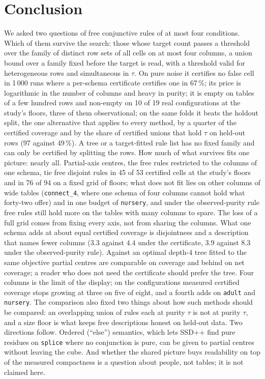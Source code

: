 \documentclass[11pt]{article}
\begin{document}
\section{Conclusion}
We asked two questions of free conjunctive rules of at most four conditions. Which of them survive the search: those whose target count passes a threshold over the family of distinct row sets of all cells on at most four columns, a union bound over a family fixed before the target is read, with a threshold valid for heterogeneous rows and simultaneous in $\tau$. On pure noise it certifies no false cell in 1\,000 runs where a per-schema certificate certifies one in 67\,\%; its price is logarithmic in the number of columns and heavy in purity; it is empty on tables of a few hundred rows and non-empty on 10 of 19 real configurations at the study's floors, three of them observational; on the same folds it beats the holdout split, the one alternative that applies to every method, by a quarter of the certified coverage and by the share of certified unions that hold $\tau$ on held-out rows (97 against 49\,\%). A tree or a target-fitted rule list has no fixed family and can only be certified by splitting the rows. How much of what survives fits one picture: nearly all. Partial-axis centres, the free rules restricted to the columns of one schema, tie free disjoint rules in 45 of 53 certified cells at the study's floors and in 76 of 94 on a fixed grid of floors; what does not fit lies on other columns of wide tables (\texttt{connect\_4}, where one schema of four columns cannot hold what forty-two offer) and in one budget of \texttt{nursery}, and under the observed-purity rule free rules still hold more on the tables with many columns to spare. The loss of a full grid comes from fixing every axis, not from sharing the columns. What one schema adds at about equal certified coverage is disjointness and a description that names fewer columns ($3.3$ against $4.4$ under the certificate, $3.9$ against $8.3$ under the observed-purity rule). Against an optimal depth-4 tree fitted to the same objective partial centres are comparable on coverage and behind on net coverage; a reader who does not need the certificate should prefer the tree. Four columns is the limit of the display; on the configurations measured certified coverage stops growing at three on five of eight, and a fourth adds on \texttt{adult} and \texttt{nursery}. The comparison also fixed two things about how such methods should be compared: an overlapping union of rules each at purity $\tau$ is not at purity $\tau$, and a size floor is what keeps free descriptions honest on held-out data. Two directions follow. Ordered (``else'') semantics, which lets SSD++ find pure residues on \texttt{splice} where no conjunction is pure, can be given to partial centres without leaving the cube. And whether the shared picture buys readability on top of the measured compactness is a question about people, not tables; it is not claimed here.
\end{document}
